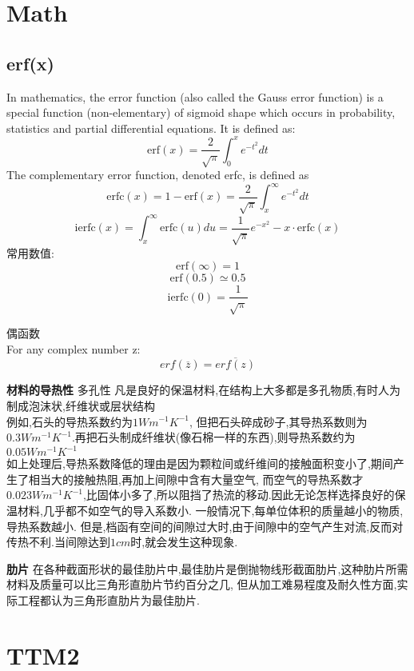 \documentclass{article}
\begin{document}
\section{Math}
\subsection{erf(x)}
In mathematics, the error function (also called the Gauss error function) is a special function (non-elementary) of sigmoid shape which occurs in probability, statistics and partial differential equations. It is defined as:
\begin{equation}
 \mbox{erf}(x)=\frac{2}{\sqrt{\pi}}\int_{0}^{x}e^{-t^2}dt
\end{equation}
The complementary error function, denoted erfc, is defined as
\begin{equation}
 \mbox{erfc}(x)=1-\mbox{erf}(x)=\frac{2}{\sqrt{\pi}}\int_{x}^{\infty }e^{-t^2}dt
\end{equation}
$$\mbox{ierfc}(x)=\int_x^{\infty}\mbox{erfc}(u)du=\frac{ 1}{\sqrt{\pi}}e^{-x^2} -  x \cdot \mbox{erfc}(x)$$
常用数值:
$$\mbox{erf}(\infty)=1$$
$$\mbox{erf}(0.5) \simeq 0.5$$
$$\mbox{ierfc}(0)=\frac{ 1}{\sqrt{\pi}}$$

偶函数\\
For any complex number z:
\begin{equation}
 erf(\overline{z})=\overline{erf(z)}
\end{equation}

\textbf{材料的导热性}
多孔性 凡是良好的保温材料,在结构上大多都是多孔物质,有时人为制成泡沫状,纤维状或层状结构 \\
例如,石头的导热系数约为$1Wm^{-1}K^{-1}$, 但把石头碎成砂子,其导热系数则为$0.3Wm^{-1}K^{-1}$.再把石头制成纤维状(像石棉一样的东西),则导热系数约为$0.05Wm^{-1}K^{-1}$ \\
如上处理后,导热系数降低的理由是因为颗粒间或纤维间的接触面积变小了,期间产生了相当大的接触热阻,再加上间隙中含有大量空气,
而空气的导热系数才$0.023Wm^{-1}K^{-1}$,比固体小多了,所以阻挡了热流的移动.因此无论怎样选择良好的保温材料,几乎都不如空气的导入系数小.
一般情况下,每单位体积的质量越小的物质,导热系数越小. 但是,档函有空间的间隙过大时,由于间隙中的空气产生对流,反而对传热不利.当间隙达到$1cm$时,就会发生这种现象.

\textbf{肋片}
在各种截面形状的最佳肋片中,最佳肋片是倒抛物线形截面肋片,这种肋片所需材料及质量可以比三角形直肋片节约百分之几,
但从加工难易程度及耐久性方面,实际工程都认为三角形直肋片为最佳肋片.

\section{TTM2}
\end{document}
